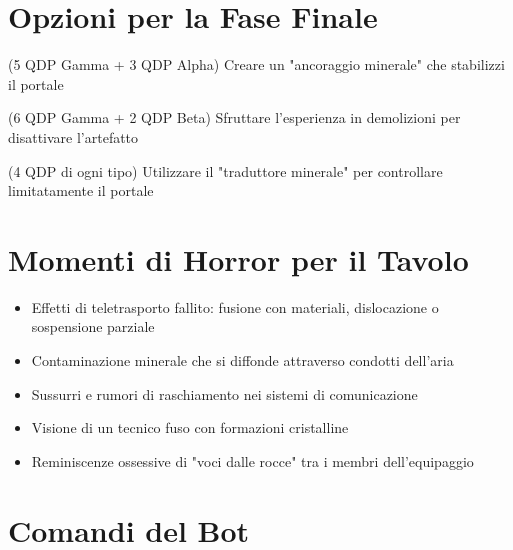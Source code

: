 \documentclass[11pt,a4paper]{article}
\begin{document}
\section{Opzioni per la Fase Finale}

\begin{tcolorbox}[colback=mininglightorange!10, colframe=miningorange]
\begin{description}[leftmargin=*]
\item[Stabilizzazione] (5 QDP Gamma + 3 QDP Alpha) Creare un "ancoraggio minerale" che stabilizzi il portale
\item[Distruzione] (6 QDP Gamma + 2 QDP Beta) Sfruttare l'esperienza in demolizioni per disattivare l'artefatto
\item[Attivazione Controllata] (4 QDP di ogni tipo) Utilizzare il "traduttore minerale" per controllare limitatamente il portale
\end{description}
\end{tcolorbox}

\section{Momenti di Horror per il Tavolo}

\begin{tcolorbox}[colback=mininglightorange!10, colframe=miningorange]
\begin{itemize}[leftmargin=*]
\item Effetti di teletrasporto fallito: fusione con materiali, dislocazione o sospensione parziale
\item Contaminazione minerale che si diffonde attraverso condotti dell'aria
\item Sussurri e rumori di raschiamento nei sistemi di comunicazione
\item Visione di un tecnico fuso con formazioni cristalline
\item Reminiscenze ossessive di "voci dalle rocce" tra i membri dell'equipaggio
\end{itemize}
\end{tcolorbox}

\section{Comandi del Bot}
\end{document}
